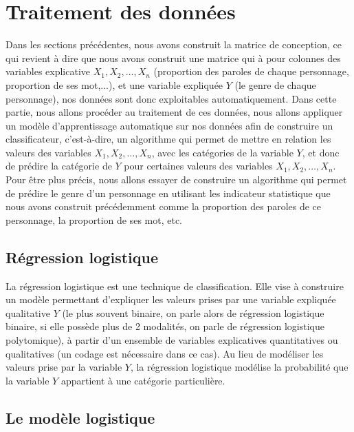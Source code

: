 \documentclass[12pt,a4paper,openany]{article}
\theoremstyle{break}
\newtheorem *{app}{ Application}[section]
\newtheorem *{prf}{ Preuve:}
\begin{document}
\section{Traitement des données}
Dans les sections précédentes, nous avons construit la matrice de conception, ce qui revient à dire que nous avons construit une matrice qui à pour colonnes des variables explicative $X_{1}, X_{2}, \dots, X_{n}$ (proportion des paroles de chaque personnage, proportion de ses mot,...), et une variable expliquée $Y$ (le genre de chaque personnage), nos données sont donc exploitables automatiquement. Dans cette partie, nous allons procéder au traitement de ces données, nous allons appliquer un modèle d'apprentissage automatique sur nos données afin de construire un classificateur, c'est-à-dire, un algorithme qui permet de mettre en relation les valeurs des variables $X_{1}, X_{2}, \dots, X_{n}$, avec les catégories de la variable $Y$, et donc de prédire la catégorie de $Y$ pour certaines valeurs des variables $X_{1}, X_{2}, \dots, X_{n}$. Pour être plus précis, nous allons essayer de construire un algorithme qui permet de prédire le genre d'un personnage en utilisant les indicateur statistique que nous avons construit précédemment comme la proportion des paroles de ce personnage, la proportion de ses mot, etc.

\subsection{Régression logistique}
La régression logistique est une technique de classification. Elle vise à construire un modèle permettant d'expliquer les valeurs prises par une variable expliquée qualitative $Y$ (le plus souvent binaire, on parle alors de régression logistique binaire, si elle possède plus de 2 modalités, on parle de régression logistique polytomique), à partir d’un ensemble de variables explicatives quantitatives ou qualitatives (un codage est nécessaire dans ce cas). Au lieu de modéliser les valeurs prise par la variable $Y$, la régression logistique modélise la probabilité que la variable $Y$ appartient à une catégorie particulière.

\subsection{Le modèle logistique}
\end{document}

